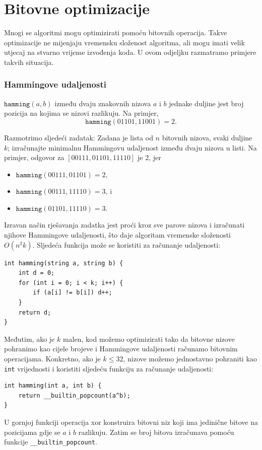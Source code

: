 \section{Bitovne optimizacije}

Mnogi se algoritmi mogu optimizirati pomoću
bitovnih operacija.
Takve optimizacije ne mijenjaju
vremensku složenost algoritma,
ali mogu imati velik utjecaj
na stvarno vrijeme izvođenja koda.
U ovom odjeljku razmatramo primjere
takvih situacija.

\subsubsection{Hammingove udaljenosti}

$\texttt{hamming}(a,b)$ između dvaju
znakovnih nizova $a$ i $b$ jednake duljine jest
broj pozicija na kojima se nizovi razlikuju.
Na primjer,
\[\texttt{hamming}(01101,11001)=2.\]

Razmotrimo sljedeći zadatak: Zadana je
lista od $n$ bitovnih nizova, svaki duljine $k$;
izračunajte minimalnu Hammingovu udaljenost
između dvaju nizova u listi.
Na primjer, odgovor za $[00111,01101,11110]$
je 2, jer
\begin{itemize}[noitemsep]
\item $\texttt{hamming}(00111,01101)=2$,
\item $\texttt{hamming}(00111,11110)=3$, i
\item $\texttt{hamming}(01101,11110)=3$.
\end{itemize}

Izravan način rješavanja zadatka jest
proći kroz sve parove nizova i izračunati
njihove Hammingove udaljenosti,
što daje algoritam vremenske složenosti $O(n^2 k)$.
Sljedeća funkcija može se koristiti za
računanje udaljenosti:
\begin{lstlisting}
int hamming(string a, string b) {
    int d = 0;
    for (int i = 0; i < k; i++) {
        if (a[i] != b[i]) d++;
    }
    return d;
}
\end{lstlisting}

Međutim, ako je $k$ malen, kod možemo optimizirati
tako da bitovne nizove pohranimo kao cijele brojeve i
Hammingove udaljenosti računamo bitovnim operacijama.
Konkretno, ako je $k \le 32$, nizove možemo jednostavno pohraniti
kao \texttt{int} vrijednosti i koristiti
sljedeću funkciju za računanje udaljenosti:
\begin{lstlisting}
int hamming(int a, int b) {
    return __builtin_popcount(a^b);
}
\end{lstlisting}
U gornjoj funkciji operacija xor konstruira
bitovni niz koji ima jedinične bitove na pozicijama
gdje se $a$ i $b$ razlikuju.
Zatim se broj bitova izračunava pomoću
funkcije \texttt{\_\_builtin\_popcount}.

